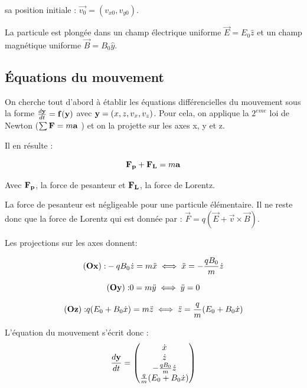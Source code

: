 \documentclass[a4paper,12pt,twoside]{article}
\begin{document}
	sa position initiale : $\vec{v_0} = (v_{x0}, v_{y0})$.
	
	La particule est plongée dans un champ \'electrique uniforme $\vec{E} = E_0 \hat{z}$ et un champ magn\'etique uniforme $\vec{B} = B_0 \hat{y}$.


	\subsection{\'Equations du mouvement}
	
		On cherche tout d'abord \`a \'etablir les \'equations diff\'erencielles du mouvement sous la forme $\frac{d\bf y}{dt} = {\bf f(\bf{y}})$ avec ${\bf y} = (x, z, v_x, v_z)$. 
		Pour cela, on applique la $2^{eme}$ loi de Newton ($\sum{\bf F} = m \bf a$ ) et on la projette sur les axes x, y et z.
		
		Il en r\'esulte :
		
		\begin{equation}
			{\bf F_p  + F_L} = m \bf{a}
		\end{equation}
		
		Avec ${\bf F_p}$, la force de pesanteur et ${\bf F_L}$, la force de Lorentz.
		
		La force de pesanteur est n\'egligeable pour une particule \'el\'ementaire. Il ne reste donc que la force de Lorentz qui est donn\'ee par : $\vec{F} = q(\vec{E}+\vec{v} \times \vec{B})$.
		
		Les projections sur les axes donnent:
		
		\begin{equation}\label{xpp}
			{\bf(Ox):} -qB_0 \dot{z} = m \ddot{x}  \iff \ddot{x} = -\frac{qB_0}{m} \dot{z}
		\end{equation}
		
		\begin{equation}
			{\bf(Oy):}  0 = m \ddot{y} \iff \ddot{y} = 0
		\end{equation}
		
		\begin{equation}\label{zpp}
			{\bf(Oz):}  q(E_0 + B_0\dot{x}) = m \ddot{z} \iff \ddot{z} = \frac{q}{m} (E_0+B_0 \dot{x}) 
		\end{equation}
		
		L'\'equation du mouvement s'\'ecrit donc :
		\begin{equation}
		\frac{d\bf y}{dt} = \begin{pmatrix}  \dot x \\ \dot z \\ -\frac{qB_0}{m} \dot{z} \\ \frac{q}{m} (E_0+B_0 \dot{x}) \end{pmatrix}
		\end{equation}
		
\end{document}
